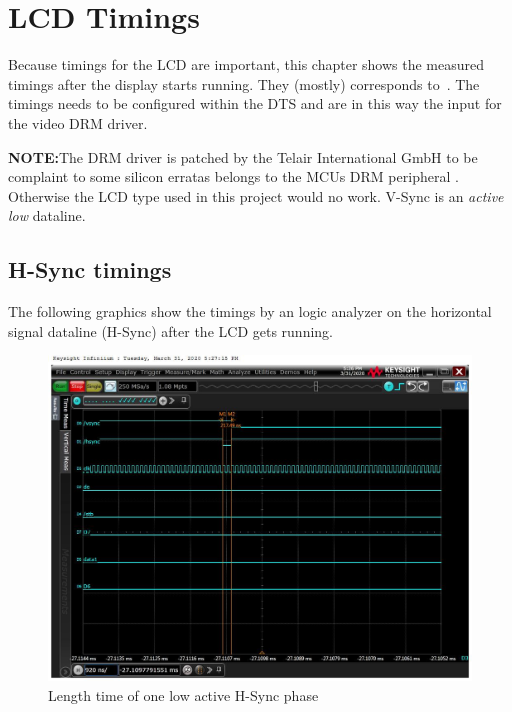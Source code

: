 

\chapter{LCD Timings}%
\label{cha:lcd_timings}

Because timings for the LCD are important, this chapter shows the measured
timings after the display starts running. They (mostly) corresponds to~\cite[LCD
data sheet]{ortustechlcd}. The timings needs to be configured within
the \gls{DTS} and are in this way the input for the video \gls{DRM} driver.

\textbf{NOTE:}\@ The DRM driver is patched by the Telair International GmbH to
be complaint to some silicon erratas belongs to the MCUs DRM peripheral
\footnotemark[1]. Otherwise the LCD
type used in this project would no work. V-Sync is an \textit{active low}
dataline.

\newpage
\section{H-Sync timings}%
\label{sub:sync_timings}

The following graphics show the timings by an logic analyzer on the horizontal
signal dataline (H-Sync) after the LCD gets running.
\begin{figure}[h!]
\begin{center}
    \includegraphics[width=14cm]{pictures/lcd_timings/hsync_length.jpg}
\end{center}
\caption{Length time of one low active H-Sync phase}
\label{fig:hsync_active_time}
\end{figure}

